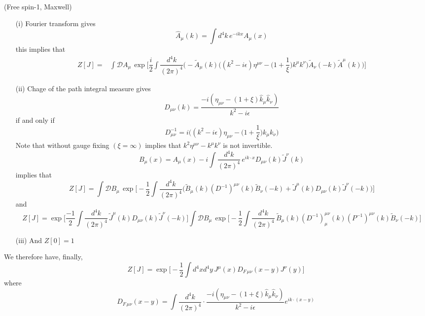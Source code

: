 \vspace{2ex}
\begin{ex}
(Free spin-1, Maxwell) 
\begin{itemize}[leftmargin=*]
\item[(i)] Fourier transform gives 
\[\hat{A}_{\mu }(k)=\int d^{4}k\,e^{-ikx}A_{\mu }(x)\]
this implies that
\[\begin{align*}
Z[J]=&\int \mathcal{D}A_{\mu }\,\exp \Big[\dfrac{i}{2}\int \dfrac{d^{4}k}{(2\pi )^{4}}\Big(-\tilde{A}_{\mu }(k)\Big((k^2-i\epsilon )\eta ^{\mu \nu }-\Big(1+\dfrac{1}{\xi }\Big)k^{\mu }k^{\nu }\Big)\tilde{A}_{\nu }(-k)\tilde{A}^{\mu }(k)\Big)\Big]
\end{align*}\]
\item[(ii)] Chage of the path integral measure gives
\[D_{\mu \nu }(k)=\dfrac{-i(\eta _{\mu \nu }-(1+\xi )\hat{k}_{\mu }\hat{k}_{\nu })}{k^2-i\epsilon }\]
if and only if
\[D_{\mu \nu }^{-1}=i\Big((k^2-i\epsilon )\eta _{\mu \nu }-\Big(1+\dfrac{1}{\xi }\Big)k_{\mu }k_{\nu }\Big)\]
Note that without gauge fixing $(\xi =\infty )$ implies that $k^2\eta ^{\mu \nu }-k^{\mu }k^{\nu }$ is not invertible.
\[B_{\mu }(x)=A_{\mu }(x)-i\int \dfrac{d^{4}k}{(2\pi )^{4}}\,e^{ik\cdot x}D_{\mu \nu }(k)\tilde{J}^{\nu }(k)\]
implies that
\[Z[J]=\int \mathcal{D}B_{\mu }\,\exp \Big[-\dfrac{1}{2}\int \dfrac{d^{4}k}{(2\pi )^{4}}\Big(\tilde{B}_{\mu }(k)(D^{-1})^{\mu \nu }(k)\tilde{B}_{\nu }(-k)+\tilde{J}^{\mu }(k)D_{\mu \nu }(k)\tilde{J}^{\nu }(-k)\Big)\Big]\]
and
\[Z[J]=\exp \Big[\dfrac{-1}{2}\int \dfrac{d^{4}k}{(2\pi )^{4}}\,\tilde{J}^{\mu }(k)D_{\mu \nu }(k)\tilde{J}^{\nu }(-k)\Big]\int \mathcal{D}B_{\mu }\,\exp \Big[-\dfrac{1}{2}\int \dfrac{d^{4}k}{(2\pi )^{4}}\,\tilde{B}_{\mu }(k)(D^{-1})^{\mu \nu }_{\mu }(k)(P^{-1})^{\mu \nu }(k)\tilde{B}_{\nu }(-k)\Big]\]
\item[(iii)] And $Z[0]=1$
\end{itemize}
We therefore have, finally,
\[Z[J]=\exp \Big[-\dfrac{1}{2}\int d^{4}xd^{4}y\,J^{\mu }(x)D_{F\,\mu \nu }(x-y)J^{\nu }(y)\Big]\]
where 
\[D_{F\,\mu \nu }(x-y)=\int \dfrac{d^{4}k}{(2\pi )^{4}}\cdot \dfrac{-i(\eta _{\mu \nu }-(1+\xi )\hat{k}_{\mu }\hat{k}_{\nu })}{k^2-i\epsilon }e^{ik\cdot (x-y)}\]
\end{ex}
\vspace{2ex}

